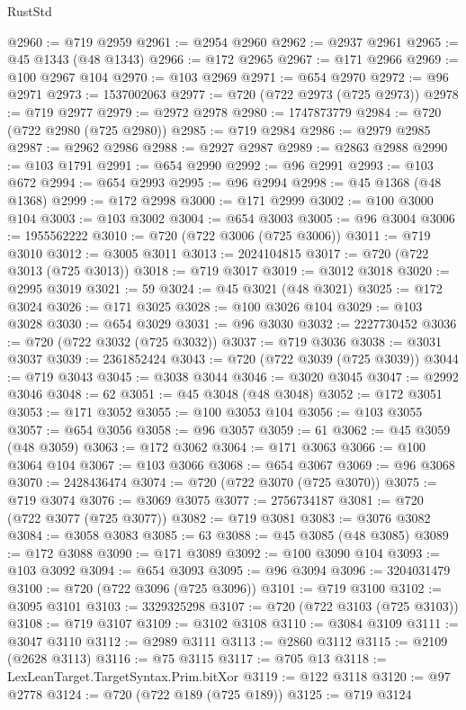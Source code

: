\begin{lexlean}{RustStd}
\begin{coremodule}
@2960 := @719 @2959
@2961 := @2954 @2960
@2962 := @2937 @2961
@2965 := @45 @1343 (@48 @1343)
@2966 := @172 @2965
@2967 := @171 @2966
@2969 := @100 @2967 @104
@2970 := @103 @2969
@2971 := @654 @2970
@2972 := @96 @2971
@2973 := 1537002063
@2977 := @720 (@722 @2973 (@725 @2973))
@2978 := @719 @2977
@2979 := @2972 @2978
@2980 := 1747873779
@2984 := @720 (@722 @2980 (@725 @2980))
@2985 := @719 @2984
@2986 := @2979 @2985
@2987 := @2962 @2986
@2988 := @2927 @2987
@2989 := @2863 @2988
@2990 := @103 @1791
@2991 := @654 @2990
@2992 := @96 @2991
@2993 := @103 @672
@2994 := @654 @2993
@2995 := @96 @2994
@2998 := @45 @1368 (@48 @1368)
@2999 := @172 @2998
@3000 := @171 @2999
@3002 := @100 @3000 @104
@3003 := @103 @3002
@3004 := @654 @3003
@3005 := @96 @3004
@3006 := 1955562222
@3010 := @720 (@722 @3006 (@725 @3006))
@3011 := @719 @3010
@3012 := @3005 @3011
@3013 := 2024104815
@3017 := @720 (@722 @3013 (@725 @3013))
@3018 := @719 @3017
@3019 := @3012 @3018
@3020 := @2995 @3019
@3021 := 59
@3024 := @45 @3021 (@48 @3021)
@3025 := @172 @3024
@3026 := @171 @3025
@3028 := @100 @3026 @104
@3029 := @103 @3028
@3030 := @654 @3029
@3031 := @96 @3030
@3032 := 2227730452
@3036 := @720 (@722 @3032 (@725 @3032))
@3037 := @719 @3036
@3038 := @3031 @3037
@3039 := 2361852424
@3043 := @720 (@722 @3039 (@725 @3039))
@3044 := @719 @3043
@3045 := @3038 @3044
@3046 := @3020 @3045
@3047 := @2992 @3046
@3048 := 62
@3051 := @45 @3048 (@48 @3048)
@3052 := @172 @3051
@3053 := @171 @3052
@3055 := @100 @3053 @104
@3056 := @103 @3055
@3057 := @654 @3056
@3058 := @96 @3057
@3059 := 61
@3062 := @45 @3059 (@48 @3059)
@3063 := @172 @3062
@3064 := @171 @3063
@3066 := @100 @3064 @104
@3067 := @103 @3066
@3068 := @654 @3067
@3069 := @96 @3068
@3070 := 2428436474
@3074 := @720 (@722 @3070 (@725 @3070))
@3075 := @719 @3074
@3076 := @3069 @3075
@3077 := 2756734187
@3081 := @720 (@722 @3077 (@725 @3077))
@3082 := @719 @3081
@3083 := @3076 @3082
@3084 := @3058 @3083
@3085 := 63
@3088 := @45 @3085 (@48 @3085)
@3089 := @172 @3088
@3090 := @171 @3089
@3092 := @100 @3090 @104
@3093 := @103 @3092
@3094 := @654 @3093
@3095 := @96 @3094
@3096 := 3204031479
@3100 := @720 (@722 @3096 (@725 @3096))
@3101 := @719 @3100
@3102 := @3095 @3101
@3103 := 3329325298
@3107 := @720 (@722 @3103 (@725 @3103))
@3108 := @719 @3107
@3109 := @3102 @3108
@3110 := @3084 @3109
@3111 := @3047 @3110
@3112 := @2989 @3111
@3113 := @2860 @3112
@3115 := @2109 (@2628 @3113)
@3116 := @75 @3115
@3117 := @705 @13
@3118 := LexLeanTarget.TargetSyntax.Prim.bitXor
@3119 := @122 @3118
@3120 := @97 @2778
@3124 := @720 (@722 @189 (@725 @189))
@3125 := @719 @3124

\end{coremodule}
\end{lexlean}
